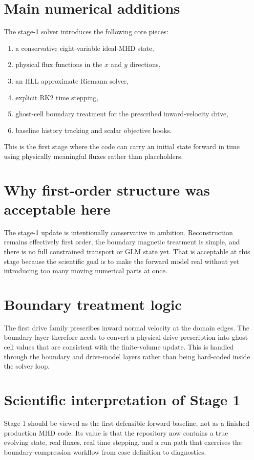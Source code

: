 \documentclass[11pt]{article}
\begin{document}
\section{Main numerical additions}
The stage-1 solver introduces the following core pieces:
\begin{enumerate}[leftmargin=1.8em]
    \item a conservative eight-variable ideal-MHD state,
    \item physical flux functions in the $x$ and $y$ directions,
    \item an HLL approximate Riemann solver,
    \item explicit RK2 time stepping,
    \item ghost-cell boundary treatment for the prescribed inward-velocity drive,
    \item baseline history tracking and scalar objective hooks.
\end{enumerate}
This is the first stage where the code can carry an initial state forward in time using physically meaningful fluxes rather than placeholders.

\section{Why first-order structure was acceptable here}
The stage-1 update is intentionally conservative in ambition. Reconstruction remains effectively first order, the boundary magnetic treatment is simple, and there is no full constrained transport or GLM state yet. That is acceptable at this stage because the scientific goal is to make the forward model real without yet introducing too many moving numerical parts at once.

\section{Boundary treatment logic}
The first drive family prescribes inward normal velocity at the domain edges. The boundary layer therefore needs to convert a physical drive prescription into ghost-cell values that are consistent with the finite-volume update. This is handled through the boundary and drive-model layers rather than being hard-coded inside the solver loop.

\section{Scientific interpretation of Stage 1}
Stage 1 should be viewed as the first defensible forward baseline, not as a finished production MHD code. Its value is that the repository now contains a true evolving state, real fluxes, real time stepping, and a run path that exercises the boundary-compression workflow from case definition to diagnostics.
\end{document}
